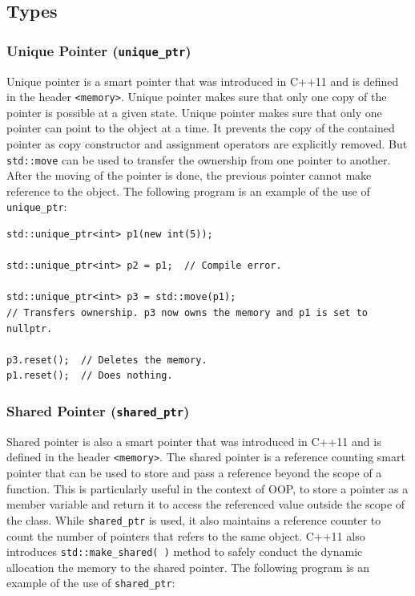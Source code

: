 \documentclass[main]{subfiles}
\begin{document}
\subsection{Types}
\subsubsection{Unique Pointer (\texttt{unique\_ptr})}
Unique pointer is a smart pointer that was introduced in C++11 and is defined in the header \texttt{<memory>}. Unique pointer makes sure that only one copy of the pointer is possible at a given state. Unique pointer makes sure that only one pointer can point to the object at a time. It prevents the copy of the contained pointer as copy constructor and assignment operators are explicitly removed\cite{smart_pointers_wikipedia}. But \texttt{std::move} can be used to transfer the ownership from one pointer to another. After the moving of the pointer is done, the previous pointer cannot make reference to the object. The following program is an example of the use of \texttt{unique\_ptr}\cite{smart_pointers_geeksforgeeks}:

\begin{verbatim}
std::unique_ptr<int> p1(new int(5));

std::unique_ptr<int> p2 = p1;  // Compile error.

std::unique_ptr<int> p3 = std::move(p1);  
// Transfers ownership. p3 now owns the memory and p1 is set to nullptr.

p3.reset();  // Deletes the memory.
p1.reset();  // Does nothing.
\end{verbatim}

\subsubsection{Shared Pointer (\texttt{shared\_ptr})}
Shared pointer is also a smart pointer that was introduced in C++11 and is defined in the header \texttt{<memory>}. The shared pointer is a reference counting smart pointer that can be used to store and pass a reference beyond the scope of a function. This is particularly useful in the context of OOP, to store a pointer as a member variable and return it to access the referenced value outside the scope of the class. While \texttt{shared\_ptr} is used, it also maintains a reference counter to count the number of pointers that refers to the same object. C++11 also introduces \texttt{std::make\_shared( )} method to safely conduct the dynamic allocation the memory to the shared pointer. The following program is an example of the use of \texttt{shared\_ptr}\cite{smart_pointers_geeksforgeeks}:
\end{document}
